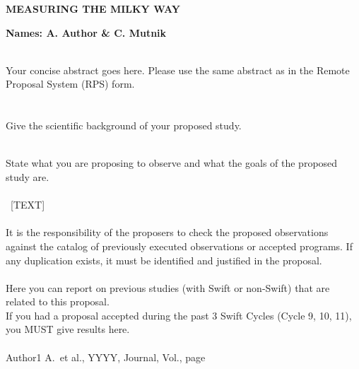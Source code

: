 \documentclass[letterpaper,11pt]{article}
\begin{document}
\pagestyle{plain}

\begin{center} 
\bfseries\uppercase{Measuring the Milky Way}
\end{center}
\vspace{-0.3cm}
\centerline{\bf Names: {A. Author} \& {C. Mutnik}}
 
\smallskip\\
Your concise abstract goes here. Please use the same abstract as in the Remote Proposal System (RPS) form. \\





\smallskip\\
\smallskip\\
Give the scientific background of your proposed study.

\smallskip\\
State what you are proposing to observe and what the goals of the proposed study are. \\

\smallskip\\
~[TEXT]\\

\smallskip\\
It is the responsibility of the proposers to check the proposed observations against 
the catalog of previously executed observations or accepted programs. 
If any duplication exists, it must be identified and justified in the proposal.\\

\smallskip\\
Here you can report on previous studies (with Swift or non-Swift) that are related to this proposal. \\
If you had a proposal accepted during the past 3 Swift Cycles (Cycle 9, 10, 11), you MUST give results here. \\

\smallskip\\
{\small
Author1 A.\ et al., YYYY, Journal, Vol., page \\
}
\end{document}

